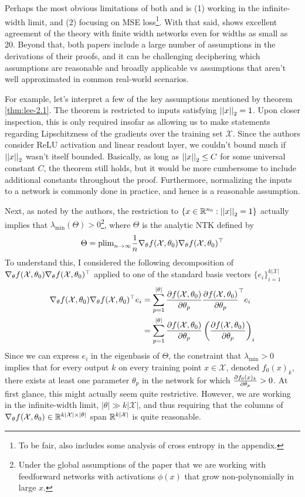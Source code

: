 \documentclass{article}
\newcommand\mc{\mathcal}
\begin{document}
Perhaps the most obvious limitations of both \cite{lee2019} and \cite{simon2021} is (1) working in the infinite-width limit, and (2) focusing on MSE loss\footnote{To be fair, \cite{lee2019} also includes some analysis of cross entropy in the appendix.}. With that said, \cite{simon2021} shows excellent agreement of the theory with finite width networks even for widths as small as 20. Beyond that, both papers include a large number of assumptions in the derivations of their proofs, and it can be challenging deciphering which assumptions are reasonable and broadly applicable vs assumptions that aren't well approximated in common real-world scenarios. 

For example, let's interpret a few of the key assumptions mentioned by theorem \ref{thm:lee-2.1}. The theorem is restricted to inputs satisfying $\left|\left| x \right|\right|_{2} = 1$. Upon closer inspection, this is only required insofar as allowing us to make statements regarding Lipschitzness of the gradients over the training set $\mc X$. Since the authors consider ReLU activation and linear readout layer, we couldn't bound much if $\left|\left| x \right|\right|_{2}$ wasn't itself bounded. Basically, as long as $\left|\left| x \right|\right|_{2} \leq C$ for some universal constant $C$, the theorem still holds, but it would be more cumbersome to include additional constants throughout the proof. Furthermore, normalizing the inputs to a network is commonly done in practice, and hence is a reasonable assumption. 


Next, as noted by the authors, the restriction to $\{ x \in \mathbb{R}^{n_0} : \left|\left| x \right|\right|_{2} = 1\}$ actually implies that $\lambda_{\text{min}}(\Theta) > 0$\footnote{Under the global assumptions of the paper that we are working with  feedforward networks with activations $\phi(x)$ that grow non-polynomially in large $x$.}, where $\Theta$ is the analytic NTK defined by 
\begin{align}
	\Theta =  \text{plim}_{n \to \infty} \inv{n} \J[0] \J[0]^\top
\end{align}
To understand this, I considered the following decomposition of $\J[0]\J[0]^\top$ applied to one of the standard basis vectors $\{ e_i \}_{i=1}^{k|\mc X|}$
\begin{align}
	\J[0]\J[0]^\top e_i 	
	&= \sum_{p=1}^{|\theta|} \pderiv{\f[0]}{\theta_p} \pderiv{\f[0]}{\theta_p}^\top e_i \\
	&=  \sum_{p=1}^{|\theta|} \pderiv{\f[0]}{\theta_p}\lr{ \pderiv{\f[0]}{\theta_p} }_i
\end{align}
Since we can express $e_i$ in the eigenbasis of $\Theta$, the constraint that $\lambda_{\text{min}} > 0$ implies that for every output $k$ on every training point $x \in \mc X$, denoted $f_0(x)_k$, there exists at least one parameter $\theta_p$ in the network for which $\frac{\partial f_0(x)_k}{\partial \theta_p} > 0$. At first glance, this might actually seem quite restrictive. However, we are working in the infinite-width limit, $|\theta|  \gg k |\mc X|$, and thus requiring that the columns of $\J[0] \in \R^{k|\mc X| \times |\theta|}$ span $\R^{k|\mc X|}$ is quite reasonable.  
\end{document}
